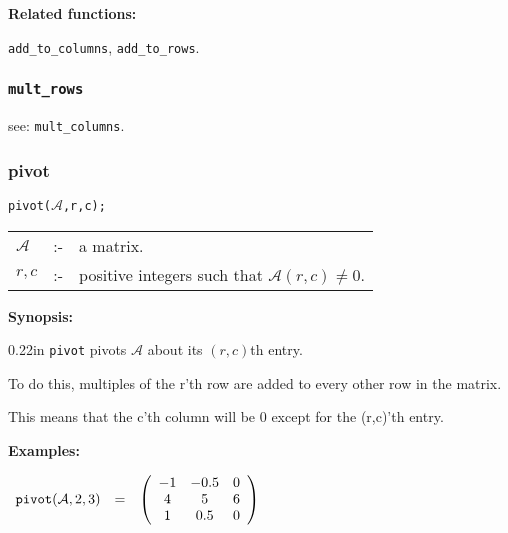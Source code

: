 {\bf Related functions:}

\hspace*{0.175in} {\tt add\_to\_columns}, {\tt add\_to\_rows}.


\subsubsection{\tt mult\_rows}
\label{linalg:mult_rows}
\hspace*{0.175in} see: {\tt mult\_columns}.


\subsubsection{pivot}
\label{linalg:pivot}


\hspace*{0.175in} {\tt pivot($\mathcal{A}$,r,c);}

\hspace*{0.1in}  
\begin{tabular}{l l l} 
$\mathcal{A}$ &:-& a matrix. \\
$r,c$        &:-& positive integers such that $\mathcal{A}(r,c) \neq 0$.
\end{tabular}

{\bf Synopsis:} %

\begin{addtolength}{\leftskip}{0.22in}
{\tt pivot} pivots $\mathcal{A}$ about its $(r,c)$th entry.
 
To do this, multiples of the r'th row are added to every
     other row in the matrix. 

This means that the c'th column
                will be 0 except for the (r,c)'th entry. 

\end{addtolength}

{\bf Examples:}

\begin{flushleft}  
\hspace*{0.1in}
\begin{math}  
\begin{array}{ccc}
{\tt pivot}(\mathcal{A},2,3) & = & 
        \left( \begin{array}{ccc} -1 & -0.5 & 0 \\ 4 & 5 & 6 \\ 1 & 0.5 
& 0
 \end{array} \right) 
\end{array}
\end{math}  
\end{flushleft}

